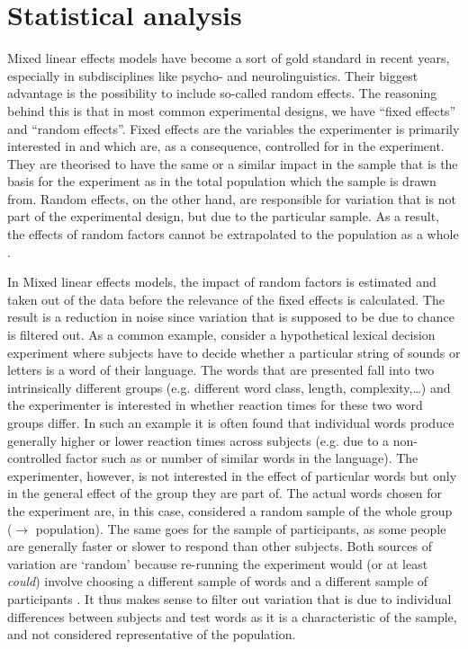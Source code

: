 	\section{Statistical analysis}
	\label{sec.prod_method.stats}

Mixed linear effects models have become a sort of gold standard in recent years, especially in subdisciplines like psycho- and neurolinguistics.
Their biggest advantage is the possibility to include so-called random effects.
The reasoning behind this is that in most common experimental designs, we have ``fixed effects'' and ``random effects''.
Fixed effects are the variables the experimenter is primarily interested in and which are, as a consequence, controlled for in the experiment.
They are theorised to have the same or a similar impact in the sample that is the basis for the experiment as in the total population which the sample is drawn from.
Random effects, on the other hand, are responsible for variation that is not part of the experimental design, but due to the particular sample.
As a result, the effects of random factors cannot be extrapolated to the population as a whole \parencite[cf.][]{barretal2013}.

In Mixed linear effects models, the impact of random factors is estimated and taken out of the data before the relevance of the fixed effects is calculated.
The result is a reduction in noise since variation that is supposed to be due to chance is filtered out.
As a common example, consider a hypothetical lexical decision experiment where subjects have to decide whether a particular string of sounds or letters is a word of their language.
The words that are presented fall into two intrinsically different groups (e.g. different word class, length, complexity,\ldots) and the experimenter is interested in whether reaction times for these two word groups differ.
In such an example it is often found that individual words produce generally higher or lower reaction times across subjects (e.g. due to a non-controlled factor such as  or number of similar words in the language).
The experimenter, however, is not interested in the effect of particular words but only in the general effect of the group they are part of.
The actual words chosen for the experiment are, in this case, considered a random sample of the whole group (\(\rightarrow\) population).
The same goes for the sample of participants, as some people are generally faster or slower to respond than other subjects.
Both sources of variation are `random' because re-running the experiment would (or at least \emph{could}) involve choosing a different sample of words and a different sample of participants \parencite[cf.][259--260]{barretal2013}.
It thus makes sense to filter out variation that is due to individual differences between subjects and test words as it is a characteristic of the sample, and not considered representative of the population.

